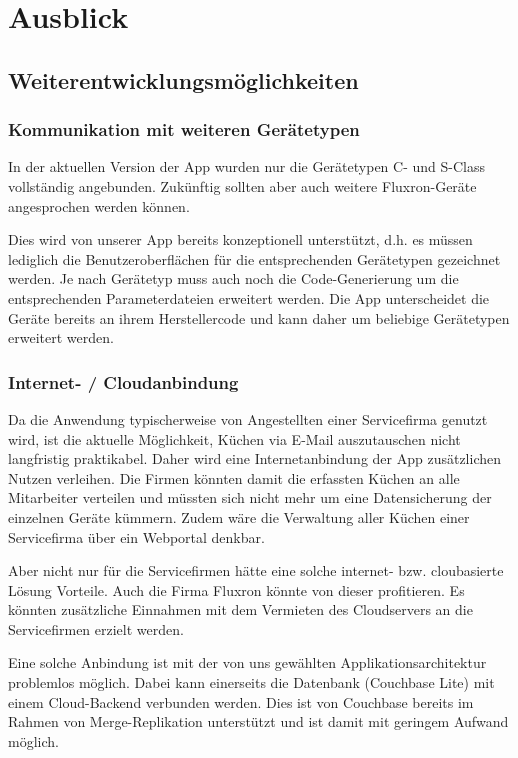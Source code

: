 \chapter{Ausblick}
\label{chap:Ausblick}

\section{Weiterentwicklungsmöglichkeiten}
\label{sec:Weiterentwicklungsmöglichkeiten}

\subsection{Kommunikation mit weiteren Gerätetypen}
\label{subsec:KommTypen}

In der aktuellen Version der App wurden nur die Gerätetypen C- und S-Class vollständig angebunden. Zukünftig sollten aber auch weitere Fluxron-Geräte angesprochen werden können.

Dies wird von unserer App bereits konzeptionell unterstützt, d.h. es müssen lediglich die Benutzeroberflächen für die entsprechenden Gerätetypen gezeichnet werden. Je nach Gerätetyp muss auch noch die Code-Generierung um die entsprechenden Parameterdateien erweitert werden. Die App unterscheidet die Geräte bereits an ihrem Herstellercode und kann daher um beliebige Gerätetypen erweitert werden.

\subsection{Internet- / Cloudanbindung}
\label{subsec:Internetanbindung}

Da die Anwendung typischerweise von Angestellten einer Servicefirma genutzt wird, ist die aktuelle Möglichkeit, Küchen via E-Mail auszutauschen nicht langfristig praktikabel. Daher wird eine Internetanbindung der App zusätzlichen Nutzen verleihen. Die Firmen könnten damit die erfassten Küchen an alle Mitarbeiter verteilen und müssten sich nicht mehr um eine Datensicherung der einzelnen Geräte kümmern. Zudem wäre die Verwaltung aller Küchen einer Servicefirma über ein Webportal denkbar.

Aber nicht nur für die Servicefirmen hätte eine solche internet- bzw. cloubasierte Lösung Vorteile. Auch die Firma Fluxron könnte von dieser profitieren. Es könnten zusätzliche Einnahmen mit dem Vermieten des Cloudservers an die Servicefirmen erzielt werden.

Eine solche Anbindung ist mit der von uns gewählten Applikationsarchitektur problemlos möglich. Dabei kann einerseits die Datenbank (Couchbase Lite) mit einem Cloud-Backend verbunden werden. Dies ist von Couchbase bereits im Rahmen von Merge-Replikation unterstützt und ist damit mit geringem Aufwand möglich.

